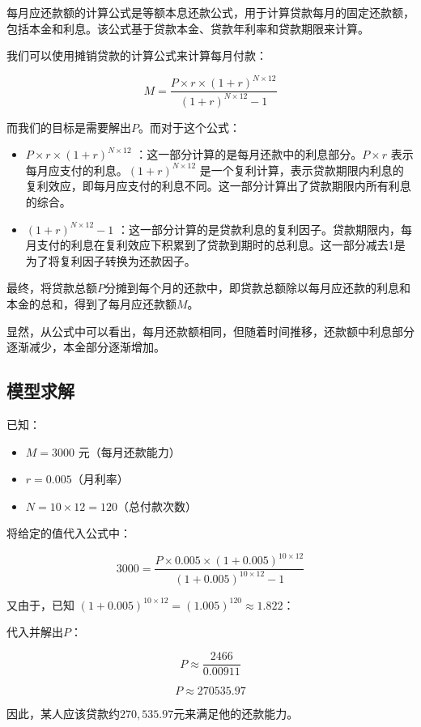 \documentclass[a4,10pt,zihao=-4]{ctexart}
\begin{document}
每月应还款额的计算公式是等额本息还款公式，用于计算贷款每月的固定还款额，包括本金和利息。该公式基于贷款本金、贷款年利率和贷款期限来计算。

我们可以使用摊销贷款的计算公式来计算每月付款：

\[
M = \frac{P \times r \times (1+r)^{N \times 12}}{(1+r)^{N \times 12}-1}
\]

而我们的目标是需要解出$P$。而对于这个公式：
\begin{itemize}
    \item $P \times r \times (1+r)^{N \times 12}$ ：这一部分计算的是每月还款中的利息部分。$P \times r$ 表示每月应支付的利息。$(1+r)^{N \times 12}$ 是一个复利计算，表示贷款期限内利息的复利效应，即每月应支付的利息不同。这一部分计算出了贷款期限内所有利息的综合。
    \item $(1+r)^{N \times 12}-1$ ：这一部分计算的是贷款利息的复利因子。贷款期限内，每月支付的利息在复利效应下积累到了贷款到期时的总利息。这一部分减去1是为了将复利因子转换为还款因子。
\end{itemize}

最终，将贷款总额$P$分摊到每个月的还款中，即贷款总额除以每月应还款的利息和本金的总和，得到了每月应还款额$M$。

显然，从公式中可以看出，每月还款额相同，但随着时间推移，还款额中利息部分逐渐减少，本金部分逐渐增加。

\subsection{模型求解}

已知：
\begin{itemize}
    \item $M = 3000$ 元（每月还款能力）
    \item $r = 0.005$（月利率）
    \item $N = 10 \times 12 = 120$（总付款次数）
\end{itemize}

将给定的值代入公式中：

\[
3000 = \frac{P \times 0.005 \times (1+0.005)^{10 \times 12}}{(1+0.005)^{10 \times 12}-1} 
\]

又由于，已知 $(1+0.005)^{10 \times 12} = (1.005)^{120} \approx 1.822$：

代入并解出$P$：

\[
P \approx \frac{2466}{0.00911}
\]

\[
P \approx 270535.97
\]

因此，某人应该贷款约$270,535.97$元来满足他的还款能力。
\end{document}
